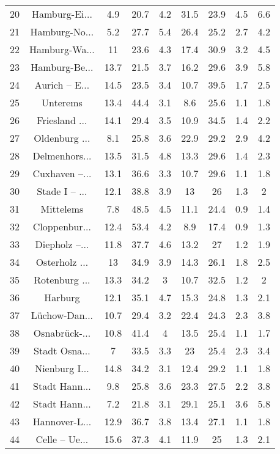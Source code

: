 \begin{table}[!htbp]
\begin{tabular}{@{\extracolsep{5pt}} ccccccccc}
20 & Hamburg-Ei... & 4.9 & 20.7 & 4.2 & 31.5 & 23.9 & 4.5 & 6.6 \\ 
21 & Hamburg-No... & 5.2 & 27.7 & 5.4 & 26.4 & 25.2 & 2.7 & 4.2 \\ 
22 & Hamburg-Wa... & 11 & 23.6 & 4.3 & 17.4 & 30.9 & 3.2 & 4.5 \\ 
23 & Hamburg-Be... & 13.7 & 21.5 & 3.7 & 16.2 & 29.6 & 3.9 & 5.8 \\ 
24 & Aurich – E... & 14.5 & 23.5 & 3.4 & 10.7 & 39.5 & 1.7 & 2.5 \\ 
25 & Unterems & 13.4 & 44.4 & 3.1 & 8.6 & 25.6 & 1.1 & 1.8 \\ 
26 & Friesland ... & 14.1 & 29.4 & 3.5 & 10.9 & 34.5 & 1.4 & 2.2 \\ 
27 & Oldenburg ... & 8.1 & 25.8 & 3.6 & 22.9 & 29.2 & 2.9 & 4.2 \\ 
28 & Delmenhors... & 13.5 & 31.5 & 4.8 & 13.3 & 29.6 & 1.4 & 2.3 \\ 
29 & Cuxhaven –... & 13.1 & 36.6 & 3.3 & 10.7 & 29.6 & 1.1 & 1.8 \\ 
30 & Stade I – ... & 12.1 & 38.8 & 3.9 & 13 & 26 & 1.3 & 2 \\ 
31 & Mittelems & 7.8 & 48.5 & 4.5 & 11.1 & 24.4 & 0.9 & 1.4 \\ 
32 & Cloppenbur... & 12.4 & 53.4 & 4.2 & 8.9 & 17.4 & 0.9 & 1.3 \\ 
33 & Diepholz –... & 11.8 & 37.7 & 4.6 & 13.2 & 27 & 1.2 & 1.9 \\ 
34 & Osterholz ... & 13 & 34.9 & 3.9 & 14.3 & 26.1 & 1.8 & 2.5 \\ 
35 & Rotenburg ... & 13.3 & 34.2 & 3 & 10.7 & 32.5 & 1.2 & 2 \\ 
36 & Harburg & 12.1 & 35.1 & 4.7 & 15.3 & 24.8 & 1.3 & 2.1 \\ 
37 & Lüchow-Dan... & 10.7 & 29.4 & 3.2 & 22.4 & 24.3 & 2.3 & 3.8 \\ 
38 & Osnabrück-... & 10.8 & 41.4 & 4 & 13.5 & 25.4 & 1.1 & 1.7 \\ 
39 & Stadt Osna... & 7 & 33.5 & 3.3 & 23 & 25.4 & 2.3 & 3.4 \\ 
40 & Nienburg I... & 14.8 & 34.2 & 3.1 & 12.4 & 29.2 & 1.1 & 1.8 \\ 
41 & Stadt Hann... & 9.8 & 25.8 & 3.6 & 23.3 & 27.5 & 2.2 & 3.8 \\ 
42 & Stadt Hann... & 7.2 & 21.8 & 3.1 & 29.1 & 25.1 & 3.6 & 5.8 \\ 
43 & Hannover-L... & 12.9 & 36.7 & 3.8 & 13.4 & 27.1 & 1.1 & 1.8 \\ 
44 & Celle – Ue... & 15.6 & 37.3 & 4.1 & 11.9 & 25 & 1.3 & 2.1 \\ 

\end{tabular}
\end{table}
